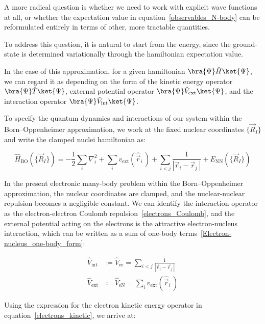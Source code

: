 A more radical question is whether we need to work with explicit wave functions at all, or whether the expectation value in equation~\eqref{observables_N-body} can be reformulated entirely in terms of other, more tractable quantities.

To address this question, it is natural to start from the energy, since the ground-state is determined variationally through the hamiltonian expectation value.

In the case of this approximation, for a given hamiltonian $\bra{\Psi}\hat{H}\ket{\Psi}$, we can regard it as depending on the form of the kinetic energy operator $\bra{\Psi}\hat{T}\ket{\Psi}$, external potential operator $\bra{\Psi}\hat{V}_\mathrm{ext}\ket{\Psi}$, and the interaction operator $\bra{\Psi}\hat{V}_\mathrm{int}\ket{\Psi}$.

To specify the quantum dynamics and interactions of our system within the Born--Oppenheimer approximation,
we work at the fixed nuclear coordinates $\{\vec{R}_I\}$ and write the clamped nuclei hamiltonian as:

\begin{equation}
    \hat{H}_\mathrm{BO}(\{\vec{R}_I\})
    = -\frac{1}{2}\sum_i\nabla_i^2
    + \sum_i v_{\mathrm{ext}}(\hat{\vec{r}}_i\,)
    + \sum_{i<j}\frac{1}{|\vec{r}_i - \vec{r}_j\,|}
    + E_\mathrm{NN}(\{\vec{R}_I\})
\label{BO_hamiltonian}
\end{equation}

In the present electronic many-body problem within the Born--Oppenheimer approximation, 
the nuclear coordinates are clamped, and the nuclear-nuclear repulsion becomes a negligible constant. 
We can identify the interaction operator as the electron-electron Coulomb repulsion~\eqref{electrons_Coulomb},
and the external potential acting on the electrons is the attractive electron-nucleus interaction, which can be written as a sum of one-body terms~\eqref{Electron-nucleus_one-body_form}:

\begin{equation}
\begin{aligned}
    \hat{V}_\mathrm{int} &\coloneqq \hat{V}_{\mathrm{ee}}
    = \sum_{i<j}\frac{1}{|\vec{r}_i-\vec{r}_j\,|} \\
    \hat{V}_\mathrm{ext} &\coloneqq \hat{V}_{\mathrm{eN}}
    =\sum_i v_\mathrm{ext}(\hat{\vec{r}}_i\,)
\end{aligned}
\label{reduced_operator_definition}
\end{equation}

Using the expression for the electron kinetic energy operator in equation~\eqref{electrons_kinetic}, we arrive at:

